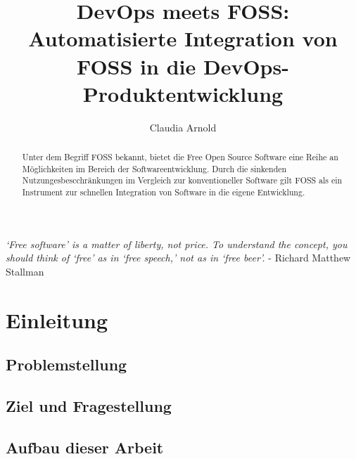 \documentclass[12pt,titlepage]{article}
\begin{document}
\title{DevOps meets FOSS: Automatisierte Integration von FOSS in die DevOps-Produktentwicklung\\}

\author{Claudia Arnold}

\maketitle

\begin{abstract}
   Unter dem Begriff FOSS bekannt, bietet die Free Open Source Software eine Reihe an Möglichkeiten im Bereich der Softwareentwicklung. Durch die sinkenden Nutzungesbescchränkungen im Vergleich zur konventioneller Software gilt FOSS als ein Instrument zur schnellen Integration von Software in die eigene Entwicklung.  
    \end{abstract}

\newpage  
\begin{center}  
    \vspace*{\fill}
    \textit{‘Free software’ is a matter of liberty, not price. To understand the concept, you should think of ‘free’ as in ‘free speech,’ not as in ‘free beer’.}
    \newline
    \newline - Richard Matthew Stallman
    \vspace*{\fill}
\end{center}

\newpage
\section{Einleitung}



\subsection{Problemstellung}



\subsection{Ziel und Fragestellung}



\subsection{Aufbau dieser Arbeit}
\end{document}
